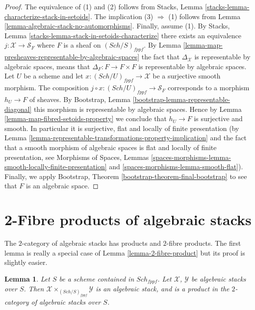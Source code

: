 \documentclass{stacks-project}
\theoremstyle{plain}
\newtheorem{lemma}[subsection]{Lemma}
\theoremstyle{definition}
\theoremstyle{remark}
\numberwithin{equation}{subsection}
\def\Sch{\mathit{Sch}}
\begin{document}
\begin{proof}
The equivalence of (1) and (2) follows from
Stacks, Lemma \ref{stacks-lemma-characterize-stack-in-setoids}.
The implication (3) $\Rightarrow$ (1) follows from
Lemma \ref{lemma-algebraic-stack-no-automorphisms}.
Finally, assume (1). By
Stacks, Lemma \ref{stacks-lemma-stack-in-setoids-characterize}
there exists an equivalence $j : \mathcal{X} \to \mathcal{S}_F$
where $F$ is a sheaf on $(\Sch/S)_{fppf}$.  By
Lemma \ref{lemma-map-presheaves-representable-by-algebraic-spaces}
the fact that $\Delta_\mathcal{X}$ is representable by algebraic
spaces, means that $\Delta_F : F \to F \times F$
is representable by algebraic spaces.
Let $U$ be a scheme and let $x : (\Sch/U)_{fppf} \to \mathcal{X}$
be a surjective smooth morphism. The composition
$j \circ x : (\Sch/U)_{fppf} \to \mathcal{S}_F$
corresponds to a morphism $h_U \to F$ of sheaves. By
Bootstrap, Lemma \ref{bootstrap-lemma-representable-diagonal}
this morphism is representable by algebraic spaces.
Hence by
Lemma \ref{lemma-map-fibred-setoids-property}
we conclude that $h_U \to F$ is surjective and smooth.
In particular it is surjective, flat and locally of finite presentation
(by
Lemma \ref{lemma-representable-transformations-property-implication}
and the fact that a smooth morphism of algebraic spaces is flat and
locally of finite presentation, see
Morphisms of Spaces,
Lemmas \ref{spaces-morphisms-lemma-smooth-locally-finite-presentation} and
\ref{spaces-morphisms-lemma-smooth-flat}).
Finally, we apply
Bootstrap, Theorem \ref{bootstrap-theorem-final-bootstrap}
to see that $F$ is an algebraic space.
\end{proof}






\section{2-Fibre products of algebraic stacks}
\label{section-2-fibre-products}

\noindent
The $2$-category of algebraic stacks has products and $2$-fibre products.
The first lemma is really a special case of
Lemma \ref{lemma-2-fibre-product}
but its proof is slightly easier.

\begin{lemma}
\label{lemma-product-spaces}
Let $S$ be a scheme contained in $\Sch_{fppf}$.
Let $\mathcal{X}$, $\mathcal{Y}$ be algebraic stacks over $S$.
Then $\mathcal{X} \times_{(\Sch/S)_{fppf}} \mathcal{Y}$
is an algebraic stack, and is a product in the $2$-category of
algebraic stacks over $S$.
\end{lemma}
\end{document}
